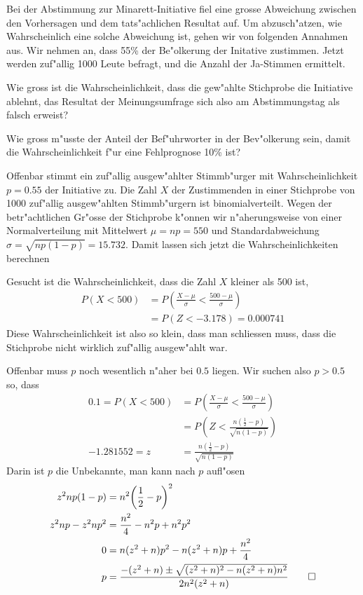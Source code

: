 Bei der Abstimmung zur Minarett-Initiative fiel eine grosse Abweichung zwischen
den Vorhersagen und dem tats"achlichen Resultat auf. Um abzusch"atzen,
wie Wahrscheinlich eine solche Abweichung ist, gehen wir von folgenden
Annahmen aus. Wir nehmen an, dass 55\% der Be"olkerung der Initative
zustimmen. Jetzt werden zuf"allig 1000 Leute befragt, und die Anzahl der
Ja-Stimmen ermittelt.
\begin{teilaufgaben}
\item
Wie gross ist die Wahrscheinlichkeit, dass die
gew"ahlte Stichprobe die Initiative ablehnt, das Resultat der
Meinungsumfrage sich also am Abstimmungstag als falsch erweist?
\item Wie gross m"usste der Anteil der Bef"uhrworter in der Bev"olkerung
sein, damit die Wahrscheinlichkeit f"ur eine Fehlprognose 10\% ist?
\end{teilaufgaben}

\begin{loesung}
Offenbar stimmt ein zuf"allig ausgew"ahlter Stimmb"urger mit
Wahrscheinlichkeit $p=0.55$ der Initiative zu. Die Zahl $X$ der Zustimmenden
in einer Stichprobe von 1000 zuf"allig ausgew"ahlten Stimmb"urgern ist
binomialverteilt. Wegen der betr"achtlichen Gr"osse der Stichprobe k"onnen
wir n"aherungsweise von einer Normalverteilung mit Mittelwert $\mu=np=550$ und
Standardabweichung $\sigma=\sqrt{np(1-p)}
=15.732
$.
Damit lassen sich jetzt die Wahrscheinlichkeiten berechnen
\begin{teilaufgaben}
\item
Gesucht ist die Wahrscheinlichkeit, dass die Zahl $X$ kleiner als 500 ist,
\begin{align*}
P(X < 500)&=P\left(\frac{X-\mu}{\sigma}<\frac{500-\mu}{\sigma}\right)\\
        &=P(Z<
-3.178
)=0.000741
\end{align*}
Diese Wahrscheinlichkeit ist also so klein, dass man schliessen muss,
dass die Stichprobe nicht wirklich zuf"allig ausgew"ahlt war.
\item
Offenbar muss $p$ noch wesentlich n"aher bei $0.5$ liegen.  Wir suchen also
$p>0.5$ so, dass
\begin{align*}
0.1=P(X<500)&=P\left(\frac{X-\mu}{\sigma}<\frac{500-\mu}{\sigma}\right)\\
&=P\left(Z<\frac{n(\frac12-p)}{\sqrt{n(1-p)}}\right)\\
-1.281552=
z&=\frac{n(\frac12-p)}{\sqrt{n(1-p)}}
\end{align*}
Darin ist $p$ die Unbekannte, man kann nach $p$ aufl"osen
\begin{align*}
z^2np(1-p)&=n^2\biggl(\frac12-p\biggr)^2\\
z^2np-z^2np^2
&=\frac{n^2}4-n^2p+n^2p^2
\\
0&=n(z^2+n)p^2
-n(z^2+n)p
+\frac{n^2}4
\\
p&=\frac{-(z^2+n)\pm\sqrt{(z^2+n)^2-n(z^2+n)n^2}}{2n^2(z^2+n)}
\qedhere
\end{align*}
\end{teilaufgaben}
\end{loesung}

